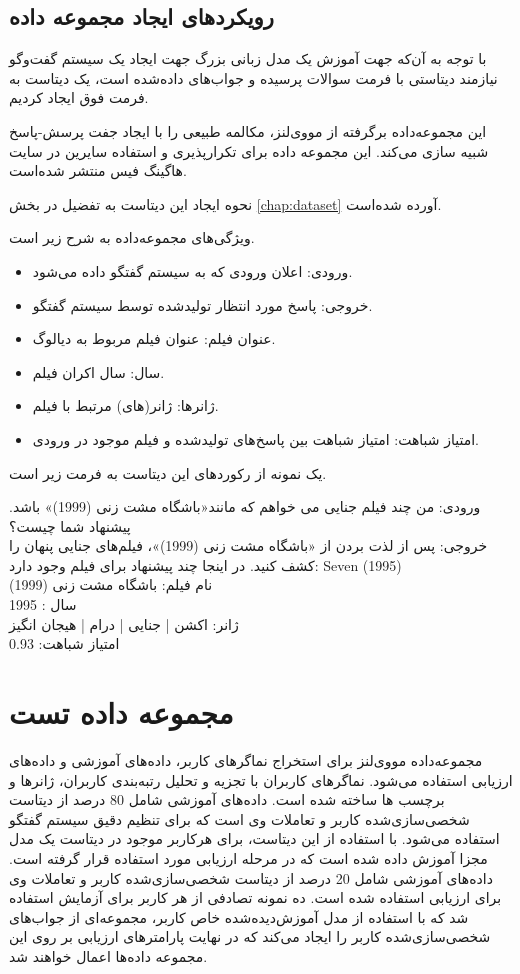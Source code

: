 \subsection{رویکردهای ایجاد مجموعه داده} 
با توجه به آن‌که جهت آموزش یک مدل زبانی بزرگ جهت ایجاد یک سیستم گفت‌وگو نیازمند دیتاستی با فرمت سوالات پرسیده و جواب‌های داده‌شده است، یک دیتاست به فرمت فوق ایجاد کردیم.

این مجموعه‌داده برگرفته از مووی‌لنز، مکالمه طبیعی را با ایجاد جفت پرسش-پاسخ شبیه سازی می‌کند. این مجموعه داده برای تکرارپذیری و استفاده سایرین در سایت هاگینگ فیس منتشر شده‌است. 

نحوه ایجاد این دیتاست به تفضیل در بخش 
\ref{chap:dataset}
آورده شده‌است.

ویژگی‌های مجموعه‌داده به شرح زیر است.
\begin{itemize}
\item
ورودی: اعلان ورودی که به سیستم گفتگو داده می‌شود.
\item
 خروجی: پاسخ مورد انتظار تولید‌شده توسط سیستم گفتگو.
\item
 عنوان فیلم: عنوان فیلم مربوط به دیالوگ.
\item
 سال: سال اکران فیلم.
\item
 ژانرها: ژانر(های) مرتبط با فیلم.
\item
امتیاز شباهت: امتیاز شباهت بین پاسخ‌های تولید‌شده و فیلم موجود در ورودی.
\end{itemize}	

یک نمونه از رکوردهای این دیتاست به فرمت زیر است.

 ورودی: من چند فیلم جنایی می خواهم که مانند«باشگاه مشت زنی (1999)» باشد. پیشنهاد شما چیست؟\\
 خروجی: پس از لذت بردن از «باشگاه مشت زنی (1999)»، فیلم‌های جنایی پنهان را کشف کنید. در اینجا چند پیشنهاد برای فیلم وجود دارد: Seven (1995)\\
 نام فیلم: باشگاه مشت زنی (1999)\\
 سال : 1995\\
 ژانر: اکشن | جنایی | درام | هیجان انگیز\\
 امتیاز شباهت: 
\num{0.93}\\


\section{مجموعه داده تست}
مجموعه‌داده مووی‌لنز برای استخراج نماگر‌های کاربر، داده‌های آموزشی و داده‌های ارزیابی استفاده می‌شود.
نماگر‌های کاربران با تجزیه و تحلیل رتبه‌بندی کاربران، ژانرها و برچسب ها ساخته شده است.
\newline
داده‌های آموزشی شامل 80 درصد از دیتاست شخصی‌سازی‌شده کاربر و تعاملات وی است که برای تنظیم دقیق سیستم گفتگو استفاده می‌شود. با استفاده از این دیتاست، برای هرکاربر موجود در دیتاست یک مدل مجزا آموزش داده شده است که در مرحله ارزیابی مورد استفاده قرار گرفته‌ است.
\newline
داده‌های آموزشی شامل 20 درصد از دیتاست شخصی‌سازی‌شده کاربر و تعاملات وی برای ارزیابی استفاده شده است. ده نمونه تصادفی از هر کاربر برای آزمایش استفاده شد که با استفاده از مدل آموزش‌دیده‌شده خاص کاربر، مجموعه‌ای از جواب‌های شخصی‌سازی‌شده کاربر را ایجاد می‌کند که در نهایت پارامترهای ارزیابی بر روی این مجموعه داده‌ها اعمال خواهند شد.



